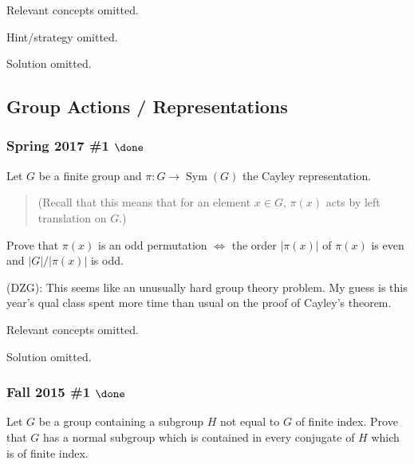 Relevant concepts omitted.

Hint/strategy omitted.

Solution omitted.

\hypertarget{group-actions-representations}{%
\subsection{Group Actions /
Representations}\label{group-actions-representations}}

\hypertarget{spring-2017-1-done}{%
\subsubsection{\texorpdfstring{Spring 2017 \#1
\(\done\)}{Spring 2017 \#1 \textbackslash done}}\label{spring-2017-1-done}}

Let \(G\) be a finite group and \(\pi: G\to \operatorname{Sym}(G)\) the
Cayley representation.

\begin{quote}
(Recall that this means that for an element \(x\in G\), \(\pi(x)\) acts
by left translation on \(G\).)
\end{quote}

Prove that \(\pi(x)\) is an odd permutation \(\iff\) the order
\({\left\lvert {\pi(x)} \right\rvert}\) of \(\pi(x)\) is even and
\({\left\lvert {G} \right\rvert} / {\left\lvert {\pi(x)} \right\rvert}\)
is odd.

\begin{warnings}

(DZG): This seems like an unusually hard group theory problem. My guess
is this year's qual class spent more time than usual on the proof of
Cayley's theorem.

\end{warnings}

Relevant concepts omitted.

Solution omitted.

\hypertarget{fall-2015-1-done}{%
\subsubsection{\texorpdfstring{Fall 2015 \#1
\(\done\)}{Fall 2015 \#1 \textbackslash done}}\label{fall-2015-1-done}}

Let \(G\) be a group containing a subgroup \(H\) not equal to \(G\) of
finite index. Prove that \(G\) has a normal subgroup which is contained
in every conjugate of \(H\) which is of finite index.

